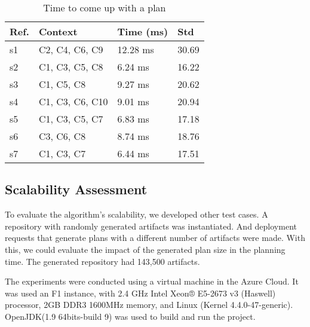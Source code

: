 \begin{table}[!htb]
\centering
\caption{Time to come up with a plan}
\begin{tabular}{|p{0.7cm}|p{3.75cm}|p{2cm}|p{2cm}|}
\hline
  Ref. &
  Context &
  Time (ms) &
  Std \\ \hline

s1 &
C2, C4, C6, C9 &
12.28 ms & 30.69 \\ \hline
s2 &
C1, C3, C5, C8 &
6.24 ms & 16.22 \\ \hline
s3 &
C1, C5, C8 &
9.27 ms & 20.62\\ \hline
s4 &
C1, C3, C6, C10 &
9.01 ms & 20.94 \\ \hline
s5 &
C1, C3, C5, C7 &
6.83 ms & 17.18 \\ \hline
s6 &
C3, C6, C8 &
8.74 ms & 18.76 \\ \hline
s7 &
C1, C3, C7  &
6.44 ms & 17.51 \\ \hline

\end{tabular}
\label{table:planning_time}
\end{table}


\subsection{Scalability Assessment}

To evaluate the algorithm's scalability, we developed other test cases.  A repository with randomly generated artifacts was instantiated. And deployment requests that generate plans with a different number of artifacts were made. With this, we could evaluate the impact of the generated plan size in the planning time.
The generated repository had 143,500 artifacts.

The experiments were conducted using a virtual machine in the Azure Cloud. It was used an F1 instance, with 2.4 GHz Intel Xeon® E5-2673 v3 (Haswell) processor,
2GB DDR3 1600MHz memory, and Linux (Kernel 4.4.0-47-generic). OpenJDK(1.9 64bits-build 9) was used to build and run the project.

